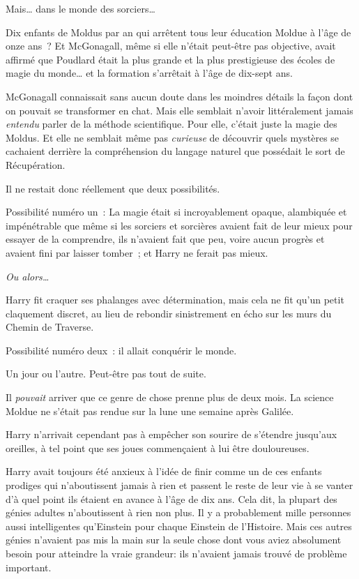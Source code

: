 Mais… dans le monde des sorciers…

Dix enfants de Moldus par an qui arrêtent tous leur éducation Moldue à l'âge de onze ans~?
Et McGonagall, même si elle n'était peut-être pas objective, avait affirmé que Poudlard était la plus grande et la plus prestigieuse des écoles de magie du monde… et la formation s'arrêtait à l'âge de dix-sept ans.

McGonagall connaissait sans aucun doute dans les moindres détails la façon dont on pouvait se transformer en chat.
Mais elle semblait n'avoir littéralement jamais \emph{entendu} parler de la méthode scientifique.
Pour elle, c'était juste la magie des Moldus.
Et elle ne semblait même pas \emph{curieuse} de découvrir quels mystères se cachaient derrière la compréhension du langage naturel que possédait le sort de Récupération.

Il ne restait donc réellement que deux possibilités.

Possibilité numéro un~: La magie était si incroyablement opaque, alambiquée et impénétrable que même si les sorciers et sorcières avaient fait de leur mieux pour essayer de la comprendre, ils n'avaient fait que peu, voire aucun progrès et avaient fini par laisser tomber~; et Harry ne ferait pas mieux.

\emph{Ou alors…}

Harry fit craquer ses phalanges avec détermination, mais cela ne fit qu'un petit claquement discret, au lieu de rebondir sinistrement en écho sur les murs du Chemin de Traverse.

Possibilité numéro deux~: il allait conquérir le monde.

Un jour ou l'autre. Peut-être pas tout de suite.

Il \emph{pouvait} arriver que ce genre de chose prenne plus de deux mois.
La science Moldue ne s'était pas rendue sur la lune une semaine après Galilée.

Harry n'arrivait cependant pas à empêcher son sourire de s'étendre jusqu'aux oreilles, à tel point que ses joues commençaient à lui être douloureuses.

Harry avait toujours été anxieux à l'idée de finir comme un de ces enfants prodiges qui n'aboutissent jamais à rien et passent le reste de leur vie à se vanter d'à quel point ils étaient en avance à l'âge de dix ans.
Cela dit, la plupart des génies adultes n'aboutissent à rien non plus.
Il y a probablement mille personnes aussi intelligentes qu'Einstein pour chaque Einstein de l'Histoire.
Mais ces autres génies n'avaient pas mis la main sur la seule chose dont vous aviez absolument besoin pour atteindre la vraie grandeur: ils n'avaient jamais trouvé de problème important.

